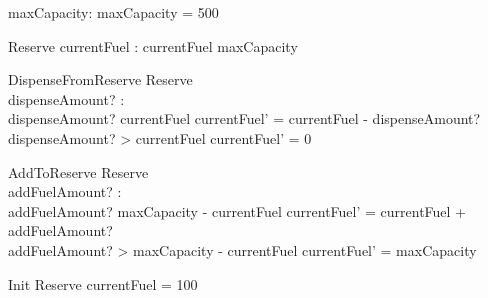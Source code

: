 

\begin{axdef}
maxCapacity: \nat
\where
maxCapacity = 500
\end{axdef}

\begin{schema}{Reserve}
currentFuel : \nat
\where
currentFuel \leq maxCapacity
\end{schema}

\begin{schema}{DispenseFromReserve}
\Delta Reserve \\
dispenseAmount? : \nat \\
\where
dispenseAmount? \leq currentFuel \implies currentFuel' = currentFuel - dispenseAmount? \\
dispenseAmount? > currentFuel \implies currentFuel' = 0
\end{schema}

\begin{schema}{AddToReserve}
\Delta Reserve \\
addFuelAmount? : \nat \\
\where
addFuelAmount? \leq maxCapacity - currentFuel  \implies currentFuel' = currentFuel + addFuelAmount? \\  
addFuelAmount? > maxCapacity - currentFuel \implies currentFuel' = maxCapacity 
\end{schema}

\begin{schema}{Init}
Reserve
\where
currentFuel = 100
\end{schema}




